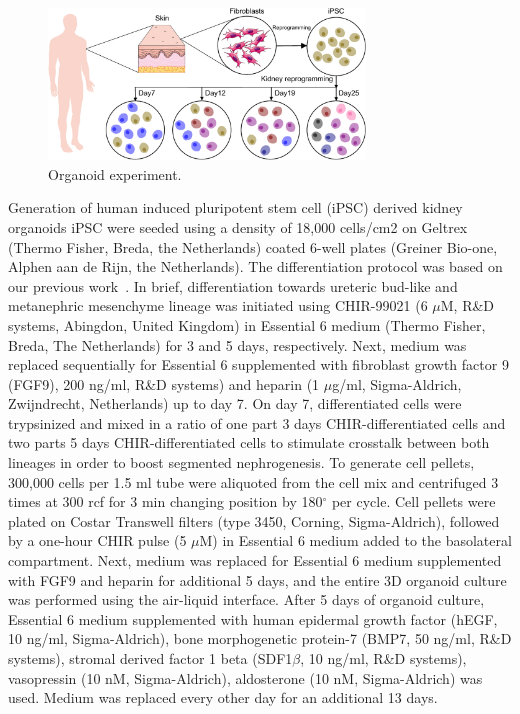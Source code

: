 \begin{figure}[!ht]
	\centering
	\includegraphics[width=0.75\textwidth]{Organoid_exp/fig}
	\vspace{0.1cm}
	\caption[Organoid experiment]{Organoid experiment.}
	\label{fig:organoid_exp}
\end{figure}

Generation of human induced pluripotent stem cell (iPSC) derived kidney organoids iPSC were seeded using a density of 18,000 cells/cm2 on Geltrex (Thermo Fisher, Breda, the Netherlands) coated 6-well plates (Greiner Bio-one, Alphen aan de Rijn, the Netherlands). The differentiation protocol was based on our previous work~\citep{jansen2022sars}. In brief, differentiation towards ureteric bud-like and metanephric mesenchyme lineage was initiated using CHIR-99021 (6 $\mu$M, R\&D systems, Abingdon, United Kingdom) in Essential 6 medium (Thermo Fisher, Breda, The Netherlands) for 3 and 5 days, respectively. Next, medium was  replaced sequentially for Essential 6 supplemented with fibroblast growth factor 9 (FGF9), 200 ng/ml, R\&D systems) and heparin (1 $\mu$g/ml, Sigma-Aldrich, Zwijndrecht, Netherlands) up to day 7. On day 7, differentiated cells were trypsinized and mixed in a ratio of one part 3 days CHIR-differentiated cells and two parts 5 days CHIR-differentiated cells to stimulate crosstalk between both lineages in order to boost segmented nephrogenesis. To generate cell pellets, 300,000 cells per 1.5 ml tube were aliquoted from the cell mix and centrifuged 3 times at 300 rcf for 3 min changing position by 180$^\circ$ per cycle. Cell pellets were plated on Costar Transwell filters (type 3450, Corning, Sigma-Aldrich), followed by a one-hour CHIR pulse (5 $\mu$M) in Essential 6 medium added to the basolateral compartment. Next, medium was replaced for Essential 6 medium supplemented with FGF9 and heparin for additional 5 days, and the entire 3D organoid culture was performed using the air-liquid interface. After 5 days of organoid culture, Essential 6 medium supplemented with human epidermal growth factor (hEGF, 10 ng/ml, Sigma-Aldrich), bone morphogenetic protein-7 (BMP7, 50 ng/ml, R\&D systems), stromal derived factor 1 beta (SDF1$\beta$, 10 ng/ml, R\&D systems), vasopressin (10 nM, Sigma-Aldrich), aldosterone (10 nM, Sigma-Aldrich) was used. Medium was replaced every other day for an additional 13 days.

